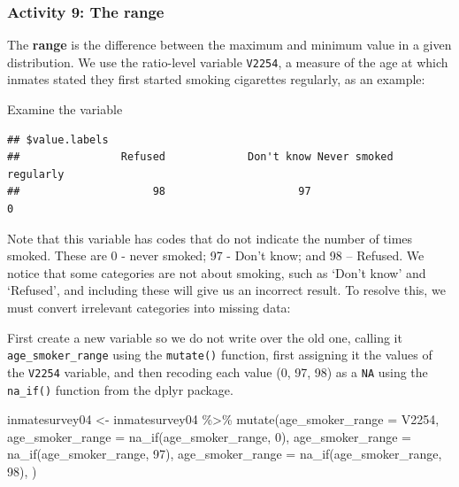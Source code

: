 \documentclass[
]{book}
\newenvironment{Shaded}{\begin{snugshade}}{\end{snugshade}}
\newcommand{\AttributeTok}[1]{\textcolor[rgb]{0.77,0.63,0.00}{#1}}
\newcommand{\DecValTok}[1]{\textcolor[rgb]{0.00,0.00,0.81}{#1}}
\newcommand{\FunctionTok}[1]{\textcolor[rgb]{0.00,0.00,0.00}{#1}}
\newcommand{\NormalTok}[1]{#1}
\newcommand{\OtherTok}[1]{\textcolor[rgb]{0.56,0.35,0.01}{#1}}
\newcommand{\SpecialCharTok}[1]{\textcolor[rgb]{0.00,0.00,0.00}{#1}}
\begin{document}
\hypertarget{activity-9-the-range}{%
\subsubsection{Activity 9: The range}\label{activity-9-the-range}}

The \textbf{range} is the difference between the maximum and minimum value in a given distribution. We use the ratio-level variable \texttt{V2254}, a measure of the age at which inmates stated they first started smoking cigarettes regularly, as an example:

Examine the variable

\begin{Shaded}
\end{Shaded}

\begin{verbatim}
## $value.labels
##                Refused             Don't know Never smoked regularly 
##                     98                     97                      0
\end{verbatim}

Note that this variable has codes that do not indicate the number of times smoked. These are 0 - never smoked; 97 - Don't know; and 98 -- Refused. We notice that some categories are not about smoking, such as `Don't know' and `Refused', and including these will give us an incorrect result. To resolve this, we must convert irrelevant categories into missing data:

First create a new variable so we do not write over the old one, calling it \texttt{age\_smoker\_range} using the \texttt{mutate()} function, first assigning it the values of the \texttt{V2254} variable, and then recoding each value (0, 97, 98) as a \texttt{NA} using the \texttt{na\_if()} function from the dplyr package.

\begin{Shaded}
\begin{Highlighting}[]
\NormalTok{inmatesurvey04 }\OtherTok{\textless{}{-}}\NormalTok{ inmatesurvey04 }\SpecialCharTok{\%\textgreater{}\%} 
  \FunctionTok{mutate}\NormalTok{(}\AttributeTok{age\_smoker\_range =}\NormalTok{ V2254,}
           \AttributeTok{age\_smoker\_range =} \FunctionTok{na\_if}\NormalTok{(age\_smoker\_range, }\DecValTok{0}\NormalTok{),}
          \AttributeTok{age\_smoker\_range =} \FunctionTok{na\_if}\NormalTok{(age\_smoker\_range, }\DecValTok{97}\NormalTok{),}
          \AttributeTok{age\_smoker\_range =} \FunctionTok{na\_if}\NormalTok{(age\_smoker\_range, }\DecValTok{98}\NormalTok{),}
\NormalTok{         )}
\end{Highlighting}
\end{Shaded}
\end{document}
